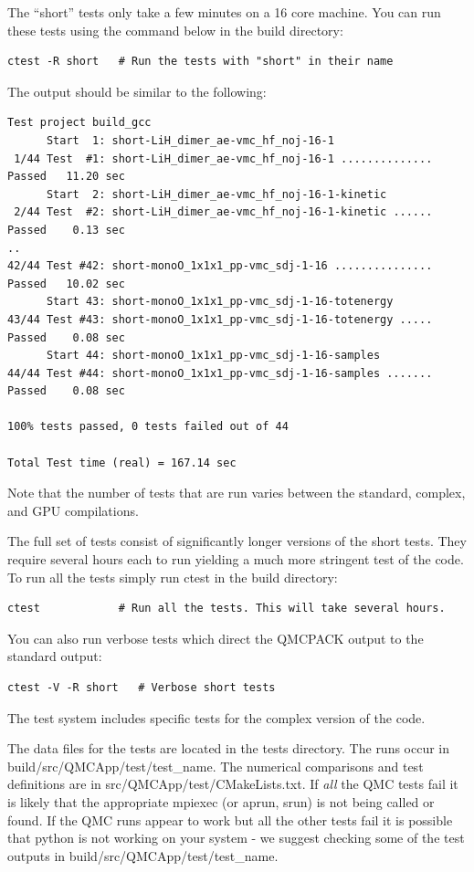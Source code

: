  The ``short'' tests only take a few minutes on a 16
core machine. You can run these tests using the command below in the
build directory:

\begin{verbatim}
ctest -R short   # Run the tests with "short" in their name
\end{verbatim}
The output should be similar to the following:
\begin{verbatim}
Test project build_gcc
      Start  1: short-LiH_dimer_ae-vmc_hf_noj-16-1
 1/44 Test  #1: short-LiH_dimer_ae-vmc_hf_noj-16-1 ..............  Passed   11.20 sec
      Start  2: short-LiH_dimer_ae-vmc_hf_noj-16-1-kinetic
 2/44 Test  #2: short-LiH_dimer_ae-vmc_hf_noj-16-1-kinetic ......  Passed    0.13 sec
..
42/44 Test #42: short-monoO_1x1x1_pp-vmc_sdj-1-16 ...............  Passed   10.02 sec
      Start 43: short-monoO_1x1x1_pp-vmc_sdj-1-16-totenergy
43/44 Test #43: short-monoO_1x1x1_pp-vmc_sdj-1-16-totenergy .....  Passed    0.08 sec
      Start 44: short-monoO_1x1x1_pp-vmc_sdj-1-16-samples
44/44 Test #44: short-monoO_1x1x1_pp-vmc_sdj-1-16-samples .......  Passed    0.08 sec

100% tests passed, 0 tests failed out of 44

Total Test time (real) = 167.14 sec
\end{verbatim}
Note that the number of tests that are run varies between the
standard, complex, and GPU compilations.

The  full set of tests consist of significantly longer versions of the short
tests. They require several hours each to run yielding a much more
stringent test of the code. To run all the tests simply run ctest in the build
directory:

\begin{verbatim}
ctest            # Run all the tests. This will take several hours.
\end{verbatim}

You can also run verbose tests which direct the QMCPACK
output to the standard output:
\begin{verbatim}
ctest -V -R short   # Verbose short tests
\end{verbatim}

The test system includes specific tests for the complex version of the code.

The data files for the tests are located in the tests directory. The
runs occur in build/src/QMCApp/test/test\_name. The numerical
comparisons and test definitions are in
src/QMCApp/test/CMakeLists.txt. If \textit{all} the QMC tests fail it is likely
that the appropriate mpiexec (or aprun, srun) is not being
called or found. If the QMC runs appear to work but all the other
tests fail it is possible that python is not working on your system -
we suggest checking some of the test outputs in build/src/QMCApp/test/test\_name.

